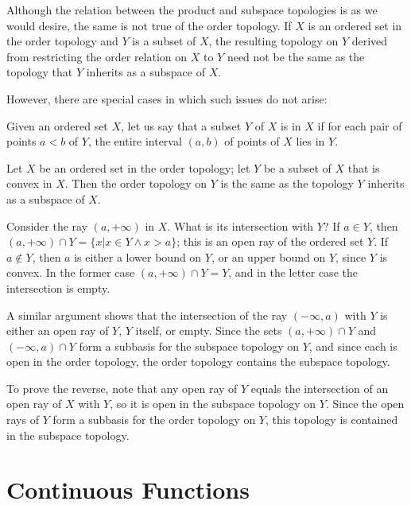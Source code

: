 \documentclass[12pt, a4paper, twoside, openright, titlepage]{book}
\begin{document}
Although the relation between the product and subspace topologies is as we would desire, the same is not true of the order topology. If $X$ is an ordered set in the order topology and $Y$ is a subset of $X$, the resulting topology on $Y$ derived from restricting the order relation on $X$ to $Y$ need not be the same as the topology that $Y$ inherits as a subspace of $X$.

However, there are special cases in which such issues do not arise:

\begin{defn}{}{}
    Given an ordered set $X$, let us say that a subset $Y$ of $X$ is  in $X$ if for each pair of points $a < b$ of $Y$, the entire interval $(a,b)$ of points of $X$ lies in $Y$.
\end{defn}

\begin{thm}{}{}
    Let $X$ be an ordered set in the order topology; let $Y$ be a subset of $X$ that is convex in $X$. Then the order topology on $Y$ is the same as the topology $Y$ inherits as a subspace of $X$.
\end{thm}
\begin{proof*}{}{}
    Consider the ray $(a,+\infty)$ in $X$. What is its intersection with $Y$? If $a \in Y$, then $(a,+\infty)\cap Y = \{x\vert x \in Y\wedge x>a\}$; this is an open ray of the ordered set $Y$. If $a \notin Y$, then $a$ is either a lower bound on $Y$, or an upper bound on $Y$, since $Y$ is convex. In the former case $(a,+\infty)\cap Y = Y$, and in the letter case the intersection is empty.

    A similar argument shows that the intersection of the ray $(-\infty,a)$ with $Y$ is either an open ray of $Y$, $Y$ itself, or empty. Since the sets $(a,+\infty)\cap Y$ and $(-\infty,a)\cap Y$ form a subbasis for the subspace topology on $Y$, and since each is open in the order topology, the order topology contains the subspace topology.

    To prove the reverse, note that any open ray of $Y$ equals the intersection of an open ray of $X$ with $Y$, so it is open in the subspace topology on $Y$. Since the open rays of $Y$ form a subbasis for the order topology on $Y$, this topology is contained in the subspace topology.
\end{proof*}




\section{Continuous Functions}
\end{document}
